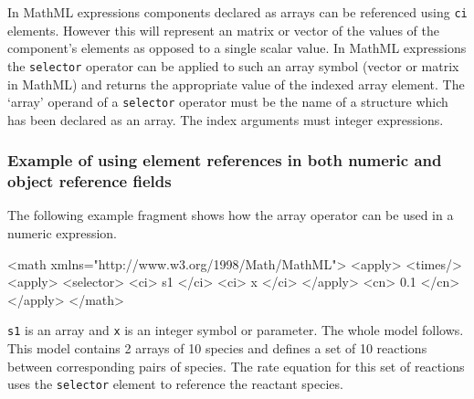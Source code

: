 \documentclass{cekarticle}
\begin{document}
In MathML expressions components declared as arrays can be referenced using \texttt{ci} elements.
However this will represent an matrix or vector of the values of the component's elements as opposed
to a single scalar value.
In MathML expressions the \texttt{selector} operator
can be applied to such an array symbol (vector or matrix in MathML) and
returns the appropriate value of the indexed array element.
The `array' operand of a \texttt{selector} operator must be the name of a
structure which has been declared as an array.  The index arguments must integer expressions.

\subsubsection{Example of using element references in both numeric and object reference fields}

The following example fragment shows how the array operator can be used in
a numeric expression.  
\begin{example}
<math xmlns="http://www.w3.org/1998/Math/MathML">
    <apply>
        <times/>
        <apply>
            <selector>
            <ci> s1 </ci>
            <ci> x </ci>
        </apply>
        <cn> 0.1 </cn>
    </apply>
</math>
\end{example}

\texttt{s1} is an array and \texttt{x} is an integer symbol or parameter.
The whole model follows.  This model contains 2 arrays of 10 species and defines
a set of 10 reactions between corresponding pairs of species. The rate equation
for this set of reactions uses the \texttt{selector} element to reference the reactant species.
\end{document}
